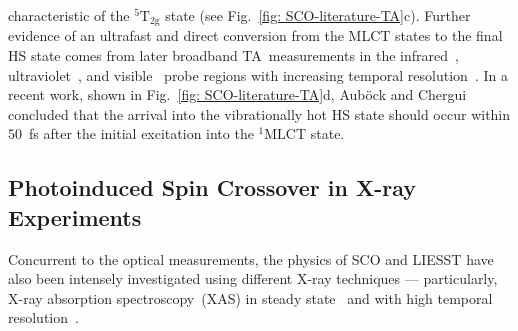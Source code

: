 characteristic of the $\mathrm{^5 T_{2g}}$ state (see Fig.~\ref{fig: SCO-literature-TA}c).
%
Further evidence of an ultrafast and direct conversion from the MLCT states to the final HS state
comes from later broadband TA~measurements in the infrared~\cite{Wolf2008},
ultraviolet~\cite{Consani2009}, and visible~\cite{Tribollet2011, Cammarata2014} probe regions
with increasing temporal resolution~\cite{Aubock2015}.
%
In a recent work, shown in Fig.~\ref{fig: SCO-literature-TA}d,
Aub\"{o}ck and Chergui~\cite{Aubock2015} concluded that
the arrival into the vibrationally hot HS state should occur within $50$~fs
after the initial excitation into the $\mathrm{^1 MLCT}$ state.


\subsection{Photoinduced Spin Crossover in X-ray Experiments}
\label{sec: SCO-photo-3}

Concurrent to the optical measurements,
the physics of SCO and LIESST have also been intensely investigated
using different X-ray techniques ---
particularly, X-ray absorption spectroscopy~(XAS)
in steady state~\cite{Briois1995, Chen1995, Erenburg1999, Lee2000, Boca2000}
and with high temporal resolution~\cite{Bressler2004, Chen2005, Bressler2008,
Bressler2010, Cannizzo2010, Milne2014, Hong2015, Zhang2015, Chergui2016,
Gawelda2016, Chergui2017b, Collet2018a}.

